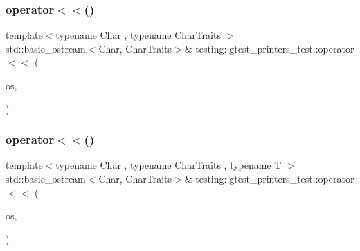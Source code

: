 \mbox{\label{namespacetesting_1_1gtest__printers__test_a1eb0213095e639d357692066e8505887}} 
\subsubsection{\texorpdfstring{operator$<$$<$()}{operator<<()}\hspace{0.1cm}{\footnotesize\ttfamily [1/3]}}
{\footnotesize\ttfamily template$<$typename Char , typename Char\+Traits $>$ \\
std\+::basic\+\_\+ostream$<$Char, Char\+Traits$>$\& testing\+::gtest\+\_\+printers\+\_\+test\+::operator$<$$<$ (\begin{DoxyParamCaption}\item[{std\+::basic\+\_\+ostream$<$ Char, Char\+Traits $>$ \&}]{os,  }\item[{const \mbox{\hyperlink{classtesting_1_1gtest__printers__test_1_1AllowsGenericStreaming}{Allows\+Generic\+Streaming}} \&}]{ }\end{DoxyParamCaption})}

\mbox{\label{namespacetesting_1_1gtest__printers__test_a5464168e925b1adf29986c8e544e908e}} 
\subsubsection{\texorpdfstring{operator$<$$<$()}{operator<<()}\hspace{0.1cm}{\footnotesize\ttfamily [2/3]}}
{\footnotesize\ttfamily template$<$typename Char , typename Char\+Traits , typename T $>$ \\
std\+::basic\+\_\+ostream$<$Char, Char\+Traits$>$\& testing\+::gtest\+\_\+printers\+\_\+test\+::operator$<$$<$ (\begin{DoxyParamCaption}\item[{std\+::basic\+\_\+ostream$<$ Char, Char\+Traits $>$ \&}]{os,  }\item[{const \mbox{\hyperlink{classtesting_1_1gtest__printers__test_1_1AllowsGenericStreamingTemplate}{Allows\+Generic\+Streaming\+Template}}$<$ T $>$ \&}]{ }\end{DoxyParamCaption})}

